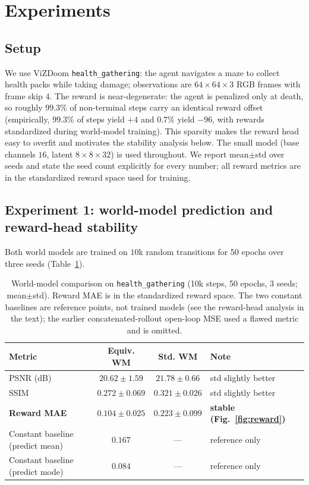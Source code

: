 \documentclass[preprint,12pt]{elsarticle}
\begin{document}
\section{Experiments}\label{sec:exp}

\subsection{Setup}
We use ViZDoom \texttt{health\_gathering}: the agent navigates a maze to
collect health packs while taking damage; observations are $64\times64\times3$
RGB frames with frame skip $4$. The reward is near-degenerate: the agent is
penalized only at death, so roughly $99.3\%$ of non-terminal steps carry an
identical reward offset (empirically, $99.3\%$ of steps yield $+4$ and
$0.7\%$ yield $-96$, with rewards standardized during world-model training).
This sparsity makes the reward head easy to overfit and motivates the
stability analysis below. The small model (base channels $16$, latent
$8\times8\times32$) is used throughout. We report mean$\pm$std over seeds and
state the seed count explicitly for every number; all reward metrics are in
the standardized reward space used for training.

\subsection{Experiment 1: world-model prediction and reward-head stability}
Both world models are trained on $10$k random transitions for 50 epochs over
three seeds (Table~\ref{tab:wm}).

\begin{table}[t]
\centering
\caption{World-model comparison on \texttt{health\_gathering} (10k steps,
50 epochs, 3 seeds; mean$\pm$std). Reward MAE is in the standardized reward
space. The two constant baselines are reference points, not trained models
(see the reward-head analysis in the text); the earlier concatenated-rollout
open-loop MSE used a flawed metric and is omitted.}
\label{tab:wm}
\small\setlength{\tabcolsep}{3pt}
\begin{tabular}{@{}lccp{2.6cm}@{}}
\toprule
Metric & Equiv. WM & Std. WM & Note \\
\midrule
PSNR (dB)            & $20.62\pm1.59$ & $21.78\pm0.66$ & std slightly better \\
SSIM                 & $0.272\pm0.069$ & $0.321\pm0.026$ & std slightly better \\
\textbf{Reward MAE}  & $\mathbf{0.104\pm0.025}$ & $0.223\pm0.099$ & \textbf{stable (Fig.~\ref{fig:reward})} \\
\midrule
Constant baseline (predict mean) & $0.167$ & --- & reference only \\
Constant baseline (predict mode) & $0.084$ & --- & reference only \\
\bottomrule
\end{tabular}
\end{table}
\end{document}
